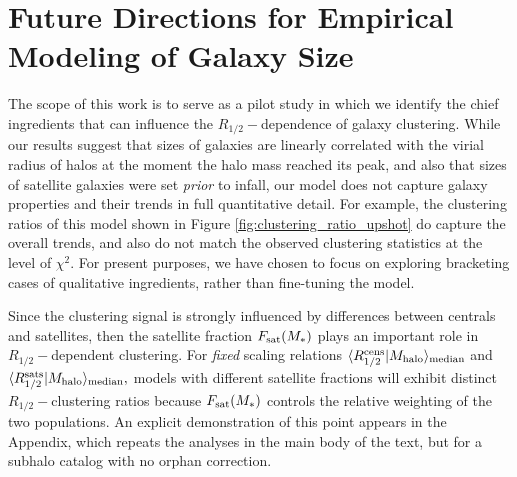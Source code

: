 \documentclass[usenatbib,usegraphicx,letterpaper]{mn2e}
\newcommand{\rhalf}{R_{1/2}}
\newcommand{\mstar}{M_{\ast}}
\newcommand{\mhalo}{M_{\rm halo}}
\newcommand{\median}[2]{\langle{#1}\vert{#2}\rangle_{\rm median}}
\begin{document}
\section{Future Directions for Empirical Modeling of Galaxy Size}
\label{sec:future}



The scope of this work is to serve as a pilot study in which we identify the chief ingredients that can influence the $\rhalf-$dependence of galaxy clustering. While our results suggest that sizes of galaxies are linearly correlated with the
virial radius of halos at the moment the halo mass reached its peak, and also that sizes of satellite galaxies were set {\em prior} to infall, our model does not capture galaxy properties and their trends in full quantitative detail.
For example, the clustering ratios of this model shown in Figure \ref{fig:clustering_ratio_upshot} do capture the overall trends, and also do not match the observed clustering statistics at the level of $\chi^2.$ For present purposes, we have chosen to focus on exploring bracketing cases of qualitative ingredients, rather than fine-tuning the model.

Since the clustering signal is strongly influenced by differences between centrals and satellites, then the satellite fraction $F_{\rm sat}(\mstar)$ plays an important role in $\rhalf-$dependent clustering. For {\em fixed} scaling relations $\median{\rhalf^{\rm cens}}{\mhalo}$ and $\median{\rhalf^{\rm sats}}{\mhalo},$ models with different satellite fractions will exhibit distinct $\rhalf-$clustering ratios because $F_{\rm sat}(\mstar)$ controls the relative weighting of the two populations. An explicit demonstration of this point appears in the Appendix, which repeats the analyses in the main body of the text, but for a subhalo catalog with no orphan correction.
\end{document}
